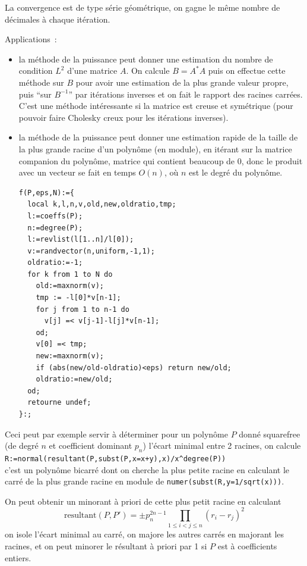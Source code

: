 \documentclass[a4paper,11pt]{article}
\begin{document}
La convergence est de type série géométrique, on gagne le même nombre
de décimales à chaque itération.

Applications~: 
\begin{itemize}
\item la m\'ethode de la puissance peut donner
une estimation du nombre de condition $L^2$ d'une
matrice $A$. On calcule $B=A^* A$ puis on effectue
cette m\'ethode sur $B$ pour avoir une estimation
de la plus grande valeur propre, puis ``sur $B^{-1}$''
par it\'erations inverses et on fait le rapport des racines carr\'ees.
C'est une m\'ethode int\'eressante si la matrice
est creuse et sym\'etrique (pour pouvoir faire Cholesky creux
pour les it\'erations inverses).
\item
la m\'ethode de la puissance peut donner une estimation
rapide de la taille de la plus grande racine d'un polyn\^ome (en
module), en it\'erant sur la matrice companion du polyn\^ome,
matrice qui contient beaucoup de 0, donc le produit avec un vecteur
se fait en temps $O(n)$, o\`u $n$ est le degr\'e du polyn\^ome.
\begin{verbatim}
f(P,eps,N):={
  local k,l,n,v,old,new,oldratio,tmp;
  l:=coeffs(P);
  n:=degree(P);
  l:=revlist(l[1..n]/l[0]);
  v:=randvector(n,uniform,-1,1);
  oldratio:=-1;
  for k from 1 to N do
    old:=maxnorm(v);
    tmp := -l[0]*v[n-1];
    for j from 1 to n-1 do
      v[j] =< v[j-1]-l[j]*v[n-1];
    od;
    v[0] =< tmp;
    new:=maxnorm(v);
    if (abs(new/old-oldratio)<eps) return new/old;
    oldratio:=new/old;
  od;
  retourne undef;
}:;
\end{verbatim}
\end{itemize}

Ceci peut par exemple servir à déterminer pour un polynôme $P$ donné
squarefree (de degr\'e $n$ et coefficient dominant $p_n$)
l'écart minimal entre 2 racines, on calcule\\
\verb|R:=normal(resultant(P,subst(P,x=x+y),x)/x^degree(P))|\\
c'est un polynôme bicarré dont on cherche la plus petite racine
en calculant le carré de la plus grande racine en module
de \verb|numer(subst(R,y=1/sqrt(x)))|.

On peut obtenir un minorant à priori de cette plus petit racine en calculant 
\[ 
\mbox{resultant}(P,P')= 
\pm p_n^{2n-1} \prod_{1 \leq i < j \leq n} (r_i-r_j)^2 
\]
on isole l'écart minimal au carré, on majore les autres carr\'es en
majorant les racines, et
on peut minorer le résultant à priori par 1 si $P$ est à coefficients
entiers.
\end{document}

